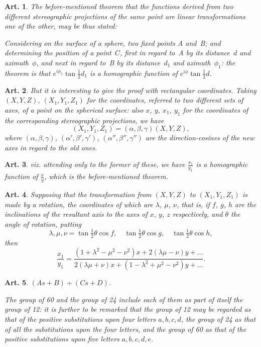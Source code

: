 \documentclass[11pt,a4paper]{article}
\theoremstyle{plain}
\newtheorem{art}{Art.}[section]
\begin{document}
\begin{art}
The before-mentioned theorem that the functions derived from two
different stereographic projections of the same point are linear
transformations one of the other, may be thus stated:

Considering on the surface of a sphere, two fixed points A and~B;
and determining the position of a point~$C$, first in regard to~A by its
distance~$d$ and azimuth~$\phi$, and next in regard to~B by its distance~$d_1$
and azimuth~$\phi_1$: the theorem is that $e^{i\phi_1} \tan\frac{1}{2}d_1$ is a homographic
function of $e^{i\phi} \tan\frac{1}{2}d$.
\end{art}

\begin{art}
But it is interesting to give the proof with rectangular coordinates.
Taking $(X, Y, Z)$, $(X_1, Y_1, Z_1)$ for the coordinates, referred to two
different sets of axes, of a point on the spherical surface: also $x$, $y$,
$x_1$, $y_1$ for the coordinates of the corresponding stereographic
projections, we have
\[
(X_1, Y_1, Z_1) = (\alpha, \beta, \gamma)(X, Y, Z),
\]
where $(\alpha, \beta, \gamma)$, $(\alpha', \beta', \gamma')$, $(\alpha'', \beta'', \gamma'')$ are the direction-cosines of
the new axes in regard to the old ones.
\end{art}

\begin{art}
viz. attending only to the former of these, we have $\frac{x_1}{y_1}$ is a homographic
function of $\frac{x}{y}$, which is the before-mentioned theorem.
\end{art}

\begin{art}
Supposing that the transformation from $(X, Y, Z)$ to $(X_1, Y_1, Z_1)$ is
made by a rotation, the coordinates of which are $\lambda$, $\mu$, $\nu$, that is,
if $f$, $g$, $h$ are the inclinations of the resultant axis to the axes of $x$,
$y$, $z$ respectively, and $\theta$ the angle of rotation, putting
\[
\lambda, \mu, \nu = \tan\tfrac{1}{2}\theta \cos f, \quad \tan\tfrac{1}{2}\theta \cos g, \quad \tan\tfrac{1}{2}\theta \cos h,
\]
then
\[
\frac{x_1}{y_1} = \frac{(1+\lambda^2-\mu^2-\nu^2)x + 2(\lambda\mu-\nu)y + \ldots}{2(\lambda\mu+\nu)x + (1-\lambda^2+\mu^2-\nu^2)y + \ldots}.
\]
\end{art}

\begin{art}
$(As + B) \div (Cs + D)$.

The group of 60 and the group of 24 include each of them as part of
itself the group of 12: it is further to be remarked that the group of 12
may be regarded as that of the positive substitutions upon four letters
$a, b, c, d$, the group of 24 as that of all the substitutions upon the four
letters, and the group of 60 as that of the positive substitutions upon
five letters $a, b, c, d, e$.
\end{art}
\end{document}
